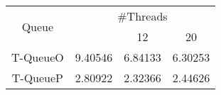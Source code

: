 \begin{tabular}{|c|c|c|c|}
\hline
\multirow{2}{*}{Queue} & \multicolumn{3}{c|}{\#Threads}\\\cline{2-4}& \quad 4 & 12 & 20\\
\hline
\hline
T-QueueO & 9.40546 & 6.84133 & 6.30253\\
T-QueueP & 2.80922 & 2.32366 & 2.44626\\
\hline\end{tabular}
